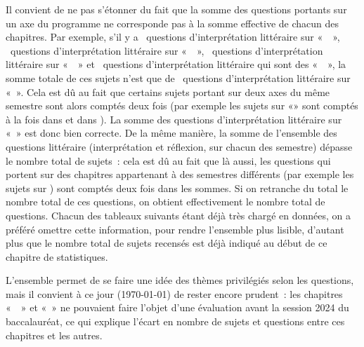 Il convient de ne pas s'étonner du fait que la somme des questions portants sur un axe du programme ne corresponde pas à la somme effective de chacun des chapitres. Par exemple, s'il y a ~questions d'interprétation littéraire sur «~\ETA{}~»{}, ~questions d'interprétation littéraire sur «~\EXS{}~»{}, ~questions d'interprétation littéraire sur «~\MM{}~»{} et ~questions d'interprétation littéraire qui sont des «~\OdS{}~»{}, la somme totale de ces sujets n'est que de ~questions d'interprétation littéraire sur «~\RS{}»{}. Cela est dû au fait que certains sujets portant sur deux axes du même semestre sont alors comptés deux fois (par exemple les sujets sur «\EXSMM{}»{} sont comptés à la fois dans \EXS{} et dans \MM{}). La somme des questions d'interprétation littéraire sur «~\RS{}»{} est donc bien correcte. De la même manière, la somme de l'ensemble des questions littéraire (interprétation et réflexion, sur chacun des semestre) dépasse le nombre total de sujets~: cela est dû au fait que là aussi, les questions qui portent sur des chapitres appartenant à des semestres différents (par exemple les sujets sur \EXSHV{}) sont comptés deux fois dans les sommes. Si on retranche du total le nombre total de ces questions, on obtient effectivement le nombre total de questions. Chacun des tableaux suivants étant déjà très chargé en données, on a préféré omettre cette information, pour rendre l'ensemble plus lisible, d'autant plus que le nombre total de sujets recensés est déjà indiqué au début de ce chapitre de statistiques.

L'ensemble permet de se faire une idée des thèmes privilégiés selon les questions, mais il convient à ce jour (\today) de rester encore prudent~: les chapitres «~\ETA{}~»{} et «~\CC{}»{} ne pouvaient faire l'objet d'une évaluation avant la session 2024 du baccalauréat, ce qui explique l'écart en nombre de sujets et questions entre ces chapitres et les autres.

\clearpage


